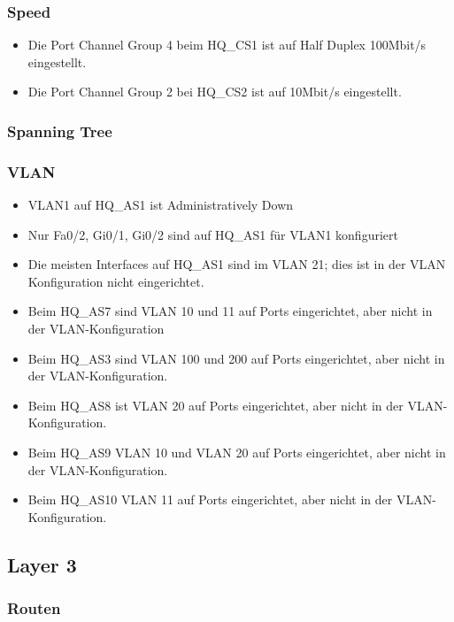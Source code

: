 \subsubsection{Speed}
\begin{itemize}
	\item Die Port Channel Group 4 beim HQ\_CS1 ist auf Half Duplex 100Mbit/s eingestellt.
	\item Die Port Channel Group 2 bei HQ\_CS2 ist auf 10Mbit/s eingestellt. 
\end{itemize}

\subsubsection{Spanning Tree}

\subsubsection{VLAN}
\begin{itemize}
	\item VLAN1 auf HQ\_AS1 ist Administratively Down
	\item Nur Fa0/2, Gi0/1, Gi0/2 sind auf HQ\_AS1 für VLAN1 konfiguriert
	\item Die meisten Interfaces auf HQ\_AS1 sind im VLAN 21; dies ist in der VLAN Konfiguration nicht eingerichtet.
	\item Beim HQ\_AS7 sind VLAN 10 und 11 auf Ports eingerichtet, aber nicht in der VLAN-Konfiguration
	\item Beim HQ\_AS3 sind VLAN 100 und 200 auf Ports eingerichtet, aber nicht in der VLAN-Konfiguration.
	\item Beim HQ\_AS8 ist VLAN 20 auf Ports eingerichtet, aber nicht in der VLAN-Konfiguration.
	\item Beim HQ\_AS9 VLAN 10 und VLAN 20 auf Ports eingerichtet, aber nicht in der VLAN-Konfiguration.
	\item Beim HQ\_AS10 VLAN 11 auf Ports eingerichtet, aber nicht in der VLAN-Konfiguration.
\end{itemize}

\subsection{Layer 3}

\subsubsection{Routen}

